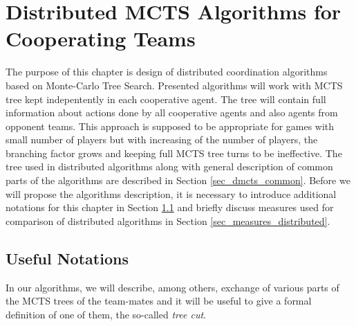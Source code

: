 \chapter{Distributed MCTS Algorithms for Cooperating Teams}
\label{chap_dmcts_design}


 The purpose of this chapter is design of distributed coordination algorithms based on
 Monte-Carlo Tree Search. Presented algorithms will work with MCTS tree kept indepentently in
 each cooperative agent. The tree will contain full information about actions done by all
 cooperative agents and also agents from opponent teams. This approach is supposed to be
 appropriate for games with small number of players but with increasing of the number of
 players, the branching factor grows and keeping full MCTS tree turns to be ineffective. The
 tree used in distributed algorithms along with general description of common parts of the
 algorithms are described in Section \ref{sec_dmcts_common}. Before we will propose the
 algorithms description, it is necessary to introduce additional notations for this chapter in
 Section \ref{sec_notations_dmcts} and briefly discuss measures used for comparison of
 distributed algorithms in Section \ref{sec_measures_distributed}. 
 


\section{Useful Notations}
\label{sec_notations_dmcts}

In our algorithms, we will describe, among others, exchange of various parts of the MCTS trees of
the team-mates and it will be useful to give a formal definition of one of them, the so-called
\emph{tree cut}.

